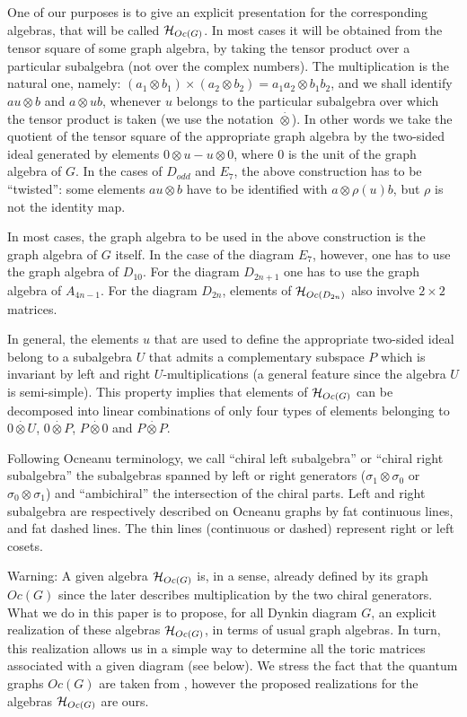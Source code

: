 \documentclass[a4paper,11pt]{article}
\def \otimesdot {\stackrel{\cdot}{\otimes}}
\begin{document}
One of our purposes is to give an explicit presentation for the
corresponding algebras, that will be called
${\cal H}_{Oc(G)}$. In most cases it will be obtained from the tensor square
of some graph algebra, by
taking the tensor product over a particular subalgebra (not over the complex
numbers).
The multiplication is the natural
one, namely: $(a_1 \otimes b_1)\times (a_2 \otimes b_2) = a_1 a_2
\otimes b_1 b_2$, and we shall identify $a u \otimes b$ and $a \otimes
ub$, whenever $u$ belongs to
the particular subalgebra over which the tensor product is taken 
(we use the notation $\otimesdot$).
In other words we take the quotient of the tensor square of the
appropriate graph algebra by the two-sided ideal generated by
elements $0\otimes u - u \otimes 0$, where $0$ is the unit of the
graph algebra of $G$. In the cases of $D_{odd}$ and $E_{7}$, the above
construction has to be ``twisted'': some elements $a u \otimes b$
have to be identified with $a \otimes \rho(u) b$, but $\rho$ is not
the identity map.

In most cases, the graph algebra to be used
in the above construction is the graph algebra of  $G$ itself.
In the case of
the diagram $E_7$, however,
one has to use the graph algebra of $D_{10}$.
For the diagram $D_{2n+1}$ one has to use the graph algebra of
$A_{4n-1}$. For the diagram $D_{2n}$, elements of ${\cal H}_{Oc(D_{2n})}$
also involve  $2\times 2$ matrices.


In general, the elements $u$ that are used to define the appropriate
two-sided ideal belong to a subalgebra $U$ that
admits a complementary subspace
$P$ which is invariant by left and right $U$-multiplications (a 
general feature since the algebra $U$ is semi-simple).
This property implies that elements
of ${\cal H}_{Oc(G)}$ can be decomposed into linear combinations of
only four types of elements belonging to $0\otimesdot U$, $0\otimesdot
P$, $P\otimesdot 0$ and $P \otimesdot P$.

Following Ocneanu terminology, we call ``chiral left subalgebra'' or ``chiral
right subalgebra'' the subalgebras spanned by left or right generators ($\sigma_1 \otimes \sigma_0$ or $\sigma_0
\otimes \sigma_1$)
       and ``ambichiral'' the intersection of the chiral parts. Left and
       right subalgebra are respectively described on Ocneanu graphs by
fat continuous lines,
       and fat dashed lines. The thin lines (continuous or dashed) represent
       right or left cosets.

       \smallskip

       Warning:  A given algebra  ${\cal H}_{Oc(G)}$ is, in a
sense, already defined
       by its graph $Oc(G)$ since the later describes multiplication by
       the two chiral generators. What we do in this paper is to
propose, for all Dynkin diagram
       $G$, an explicit  realization of these algebras ${\cal
       H}_{Oc(G)}$, in terms of usual graph algebras. In turn,
       this realization allows us in a simple way to determine all the
toric matrices
       associated with a given diagram (see below).
         We stress the fact that the quantum graphs $Oc(G)$ are taken from
       \cite{Ocneanu:paths}, however the proposed realizations for the
       algebras ${\cal H}_{Oc(G)}$ are ours.
\end{document}
